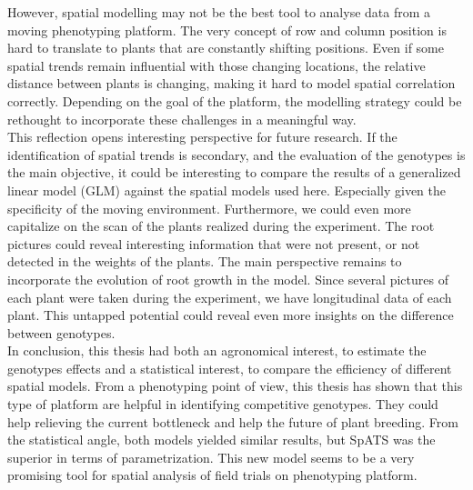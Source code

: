 However, spatial modelling may not be the best tool to analyse data from a moving phenotyping platform. The very concept of row and column position is hard to translate to plants that are constantly shifting positions. Even if some spatial trends remain influential with those changing locations, the relative distance between plants is changing, making it hard to model spatial correlation correctly. Depending on the goal of the platform, the modelling strategy could be rethought to incorporate these challenges in a meaningful way.\\

This reflection opens interesting perspective for future research. If the identification of spatial trends is secondary, and the evaluation of the genotypes is the main objective, it could be interesting to compare the results of a generalized linear model (GLM) against the spatial models used here. Especially given the specificity of the moving environment. Furthermore, we could even more capitalize on the scan of the plants realized during the experiment. The root pictures could reveal interesting information that were not present, or not detected in the weights of the plants. The main perspective remains to incorporate the evolution of root growth in the model. Since several pictures of each plant were taken during the experiment, we have longitudinal data of each plant. This untapped potential could reveal even more insights on the difference between genotypes.\\

In conclusion, this thesis had both an agronomical interest, to estimate the genotypes effects and a statistical interest, to compare the efficiency of different spatial models. From a phenotyping point of view, this thesis has shown that this type of platform are helpful in identifying competitive genotypes. They could help relieving the current bottleneck and help the future of plant breeding.  From the statistical angle, both models yielded similar results, but SpATS was the superior in terms of parametrization. This new model seems to be a very promising tool for spatial analysis of field trials on phenotyping platform.

